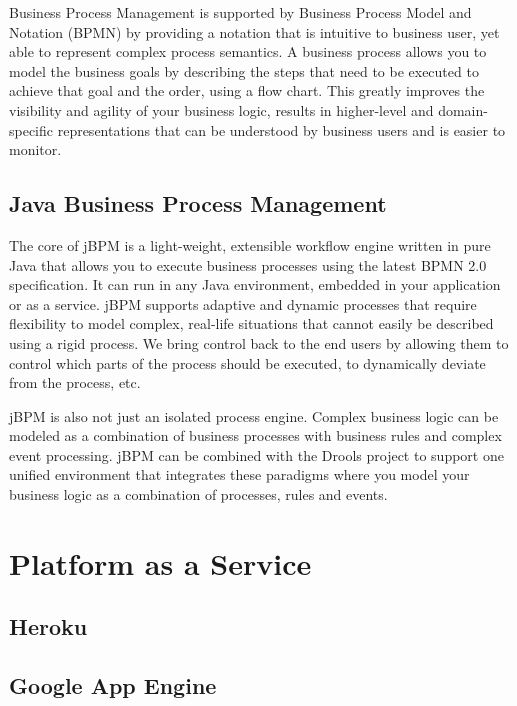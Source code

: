 			Business Process Management is supported by Business Process Model and Notation (BPMN) by providing a notation that is intuitive to business user, yet able to represent complex process semantics. A business process allows you to model the business goals by describing the steps that need to be executed to achieve that goal and the order, using a flow chart. This greatly improves the visibility and agility of your business logic, results in higher-level and domain-specific representations that can be understood by business users and is easier to monitor.

\subsection{Java Business Process Management}

					The core of jBPM is a light-weight, extensible workflow engine written in pure Java that allows you to execute business processes using the latest BPMN 2.0 specification. It can run in any Java environment, embedded in your application or as a service.	jBPM supports adaptive and dynamic processes that require flexibility to model complex, real-life situations that cannot easily be described using a rigid process. We bring control back to the end users by allowing them to control which parts of the process should be executed, to dynamically deviate from the process, etc.

jBPM is also not just an isolated process engine. Complex business logic can be modeled as a combination of business processes with business rules and complex event processing. jBPM can be combined with the Drools project to support one unified environment that integrates these paradigms where you model your business logic as a combination of processes, rules and events.			
				

\section{Platform as a Service}

\subsection{Heroku}
\subsection{Google App Engine}



